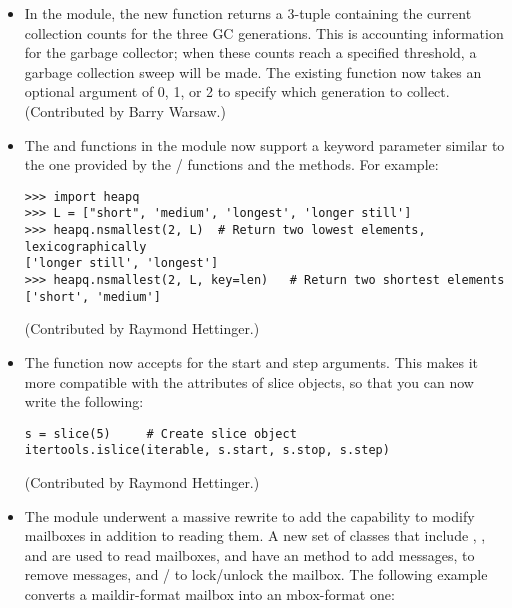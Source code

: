 \documentclass{howto}
\begin{document}
\begin{itemize}
\item In the  module, the new  function
returns a 3-tuple containing the current collection counts for the
three GC generations.  This is accounting information for the garbage
collector; when these counts reach a specified threshold, a garbage
collection sweep will be made.  The existing 
function now takes an optional  argument of 0, 1, or 2
to specify which generation to collect.
(Contributed by Barry Warsaw.)

\item The  and 
 functions in the  module 
now support a  keyword parameter similar to the one
provided by the / functions
and the  methods.  For example:

\begin{verbatim}
>>> import heapq
>>> L = ["short", 'medium', 'longest', 'longer still']
>>> heapq.nsmallest(2, L)  # Return two lowest elements, lexicographically
['longer still', 'longest']
>>> heapq.nsmallest(2, L, key=len)   # Return two shortest elements
['short', 'medium']
\end{verbatim}

(Contributed by Raymond Hettinger.)

\item The  function now accepts
 for the start and step arguments.  This makes it more
compatible with the attributes of slice objects, so that you can now write
the following:

\begin{verbatim}
s = slice(5)     # Create slice object
itertools.islice(iterable, s.start, s.stop, s.step)
\end{verbatim}

(Contributed by Raymond Hettinger.)

\item The  module underwent a massive rewrite to add
the capability to modify mailboxes in addition to reading them.  A new
set of classes that include , , and
 are used to read mailboxes, and have an
 method to add messages,
 to remove messages, and
/ to lock/unlock the mailbox.  The
following example converts a maildir-format mailbox into an mbox-format one:


\end{itemize}
\end{document}
